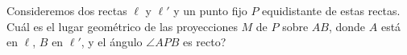 Consideremos dos rectas $\ell$ y $\ell ' $ y un punto fijo $P$ equidistante de estas rectas. Cuál es el lugar geométrico de las proyecciones $M$ de $P$ sobre $AB$, donde $A$ está en $\ell $, $B$ en $\ell ' $, y el ángulo $\angle APB$ es recto?
